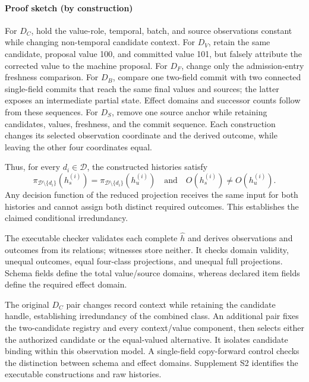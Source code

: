 \paragraph{Proof sketch (by construction)}
For $D_C$, hold the value-role, temporal, batch, and source observations constant while changing non-temporal candidate context. For $D_V$, retain the same candidate, proposal value 100, and committed value 101, but falsely attribute the corrected value to the machine proposal. For $D_F$, change only the admission-entry freshness comparison. For $D_B$, compare one two-field commit with two connected single-field commits that reach the same final values and sources; the latter exposes an intermediate partial state. Effect domains and successor counts follow from these sequences. For $D_S$, remove one source anchor while retaining candidates, values, freshness, and the commit sequence. Each construction changes its selected observation coordinate and the derived outcome, while leaving the other four coordinates equal.

Thus, for every $d_i\in\mathcal D$, the constructed histories satisfy
\begin{equation}
\pi_{\mathcal D\setminus\{d_i\}}(h_s^{(i)})
=
\pi_{\mathcal D\setminus\{d_i\}}(h_u^{(i)})
\quad\text{and}\quad
O(h_s^{(i)})\neq O(h_u^{(i)}).
\label{eq:irredundancy}
\end{equation}
Any decision function of the reduced projection receives the same input for both histories and cannot assign both distinct required outcomes. This establishes the claimed conditional irredundancy.

The executable checker validates each complete $\widehat h$ and derives observations and outcomes from its relations; witnesses store neither. It checks domain validity, unequal outcomes, equal four-class projections, and unequal full projections. Schema fields define the total value/source domains, whereas declared item fields define the required effect domain.

The original $D_C$ pair changes record context while retaining the candidate handle, establishing irredundancy of the combined class. An additional pair fixes the two-candidate registry and every context/value component, then selects either the authorized candidate or the equal-valued alternative. It isolates candidate binding within this observation model. A single-field copy-forward control checks the distinction between schema and effect domains. Supplement S2 identifies the executable constructions and raw histories.

